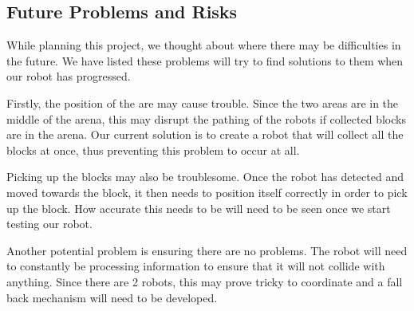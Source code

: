 
\subsection{Future Problems and Risks}

While planning this project, we thought about where there may be difficulties in the future. We have listed these problems will try to find solutions to them when our robot has progressed.

Firstly, the position of the are may cause trouble. Since the two areas are in the middle of the arena, this may disrupt the pathing of the robots if collected blocks are in the arena. Our current solution is to create a robot that will collect all the blocks at once, thus preventing this problem to occur at all.

Picking up the blocks may also be troublesome. Once the robot has detected and moved towards the block, it then needs to position itself correctly in order to pick up the block. How accurate this needs to be will need to be seen once we start testing our robot.

Another potential problem is ensuring there are no problems. The robot will need to constantly be processing information to ensure that it will not collide with anything. Since there are 2 robots, this may prove tricky to coordinate and a fall back mechanism will need to be developed.


